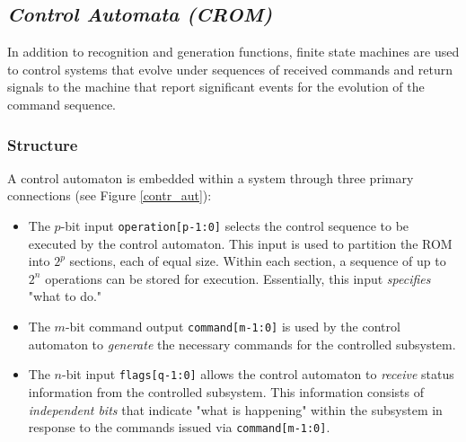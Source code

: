 \subsection{{\bf {\em Control Automata (CROM)}}}\label{contrAut}
In addition to recognition and generation functions, finite state machines are used to control systems that evolve under sequences of received commands and return signals to the machine that report significant events for the evolution of the command sequence.

\subsubsection{Structure}
A control automaton is embedded within a system through three primary connections (see Figure \ref{contr_aut}):
\begin{itemize}
    \item The $p$-bit input {\tt operation[p-1:0]} selects the control
    sequence to be executed by the control automaton. This input is used 
    to partition the ROM into $2^{p}$ sections, each of equal size. 
    Within each section, a sequence of up to $2^{n}$ operations can be 
    stored for execution. Essentially, this input {\em specifies} "what to do."
    
    \item The $m$-bit command output {\tt command[m-1:0]} is used by 
    the control automaton to {\em generate} the necessary commands 
    for the controlled subsystem.
    
    \item The $n$-bit input {\tt flags[q-1:0]} allows the control 
    automaton to {\em receive} status information from the controlled 
    subsystem. This information consists of {\em independent bits} that 
    indicate "what is happening" within the subsystem in response to 
    the commands issued via {\tt command[m-1:0]}.
\end{itemize}



